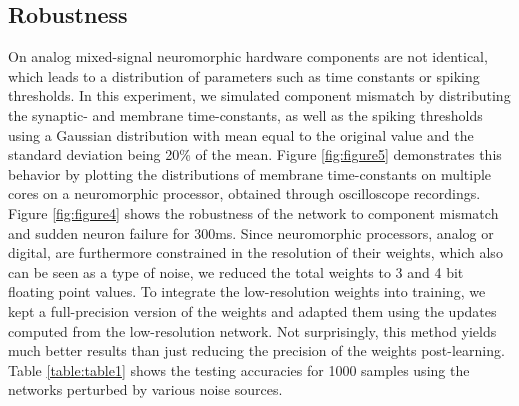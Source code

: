 \documentclass[twoside,11pt,titlepage]{article}
\begin{document}
\subsection{Robustness}

On analog mixed-signal neuromorphic hardware components are not identical, which leads to a distribution
of parameters such as time constants or spiking thresholds. In this experiment, we simulated component mismatch by
distributing the synaptic- and membrane time-constants, as well as the spiking thresholds using a Gaussian distribution with mean
equal to the original value and the standard deviation being 20\% of the mean. Figure \ref{fig:figure5} demonstrates this behavior by plotting
the distributions of membrane time-constants on multiple cores on a neuromorphic processor, obtained through oscilloscope recordings.
Figure \ref{fig:figure4} shows the robustness of the network to component mismatch and sudden neuron failure for 300ms. Since neuromorphic
processors, analog or digital, are furthermore constrained in the resolution of their weights, which also can be seen as a type of noise,
we reduced the total weights to 3 and 4 bit floating point values. To integrate the low-resolution weights into training, we kept a
full-precision version of the weights and adapted them using the updates computed from the low-resolution network. Not surprisingly,
this method yields much better results than just reducing the precision of the weights post-learning. Table \ref{table:table1} shows the
testing accuracies for 1000 samples using the networks perturbed by various noise sources.
\end{document}
